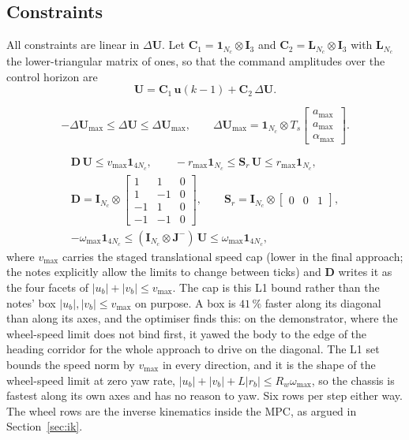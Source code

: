 \documentclass[11pt,a4paper]{article}
\newcommand{\vect}[1]{\bm{#1}}
\newcommand{\mat}[1]{\bm{#1}}
\newcommand{\dU}{\Delta\vect{U}}
\newcommand{\Ts}{T_s}
\newcommand{\Nc}{N_c}
\newcommand{\ones}{\vect{1}}
\begin{document}
\subsection{Constraints}
\label{sec:constraints}
All constraints are linear in $\dU$. Let $\mat C_1 = \ones_{\Nc}\otimes\mat I_3$ and $\mat C_2 = \mat L_{\Nc}\otimes\mat I_3$ with $\mat L_{\Nc}$ the lower-triangular matrix of ones, so that the command amplitudes over the control horizon are
\begin{equation}
\vect U = \mat C_1\,\vect u(k-1) + \mat C_2\,\dU .
\end{equation}

\begin{description}[leftmargin=1.6em,style=nextline]
  \item[(i) Increments: acceleration and anti-slip limits.]
  \begin{equation}
  -\dU_{\max}\le\dU\le\dU_{\max},\qquad
  \dU_{\max} = \ones_{\Nc}\otimes\Ts\begin{bmatrix}a_{\max}\\ a_{\max}\\ \alpha_{\max}\end{bmatrix}.
  \end{equation}
  \item[(ii) Amplitudes: speed cap, yaw-rate cap and per-wheel motor limits.]
  \begin{gather}
  \mat D\,\vect U\le v_{\max}\ones_{4\Nc},\qquad
  -r_{\max}\ones_{\Nc}\le\mat S_r\,\vect U\le r_{\max}\ones_{\Nc},\\
  \mat D = \mat I_{\Nc}\otimes\begin{bmatrix}1&1&0\\1&-1&0\\-1&1&0\\-1&-1&0\end{bmatrix},\qquad
  \mat S_r = \mat I_{\Nc}\otimes\begin{bmatrix}0&0&1\end{bmatrix},\\
  -\omega_{\max}\ones_{4\Nc}\le(\mat I_{\Nc}\otimes\mat J^{-})\,\vect U\le\omega_{\max}\ones_{4\Nc},
  \end{gather}
  where $v_{\max}$ carries the staged translational speed cap (lower in the final approach; the notes explicitly allow the limits to change between ticks) and $\mat D$ writes it as the four facets of $|u_b|+|v_b|\le v_{\max}$. The cap is this L1 bound rather than the notes' box $|u_b|,|v_b|\le v_{\max}$ on purpose. A box is $41\,\%$ faster along its diagonal than along its axes, and the optimiser finds this: on the demonstrator, where the wheel-speed limit does not bind first, it yawed the body to the edge of the heading corridor for the whole approach to drive on the diagonal. The L1 set bounds the speed norm by $v_{\max}$ in every direction, and it is the shape of the wheel-speed limit at zero yaw rate, $|u_b|+|v_b|+L|r_b|\le R_w\omega_{\max}$, so the chassis is fastest along its own axes and has no reason to yaw. Six rows per step either way. The wheel rows are the inverse kinematics inside the MPC, as argued in Section~\ref{sec:ik}.

\end{description}
\end{document}
